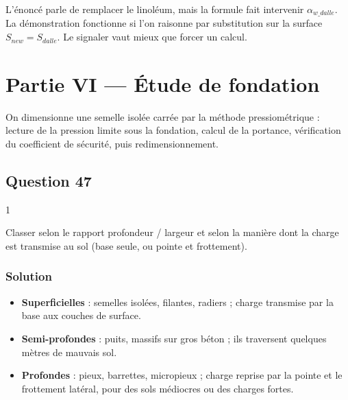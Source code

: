 \documentclass[11pt,a4paper]{article}
\providecommand{\tightlist}{\setlength{\itemsep}{0pt}\setlength{\parskip}{0pt}}
\begin{document}
\begin{piege}

L'énoncé parle de remplacer le linoléum, mais la formule fait intervenir \(\alpha_{w\_dalle}\). La démonstration fonctionne si l'on raisonne par substitution sur la surface \(S_{new}=S_{dalle}\). Le signaler vaut mieux que forcer un calcul.

\end{piege}

\hypertarget{partie-vi-uxe9tude-de-fondation}{%
\section{Partie VI --- Étude de fondation}\label{partie-vi-uxe9tude-de-fondation}}

On dimensionne une semelle isolée carrée par la méthode pressiométrique : lecture de la pression limite sous la fondation, calcul de la portance, vérification du coefficient de sécurité, puis redimensionnement.

\hypertarget{question-47}{%
\subsection{Question 47}\label{question-47}}

\begin{indication}{1}

Classer selon le rapport profondeur / largeur et selon la manière dont la charge est transmise au sol (base seule, ou pointe et frottement).

\end{indication}

\hypertarget{solution-46}{%
\subsubsection{Solution}\label{solution-46}}

\begin{itemize}
\tightlist
\item
  \textbf{Superficielles} : semelles isolées, filantes, radiers ; charge transmise par la base aux couches de surface.
\item
  \textbf{Semi-profondes} : puits, massifs sur gros béton ; ils traversent quelques mètres de mauvais sol.
\item
  \textbf{Profondes} : pieux, barrettes, micropieux ; charge reprise par la pointe et le frottement latéral, pour des sols médiocres ou des charges fortes.
\end{itemize}
\end{document}
